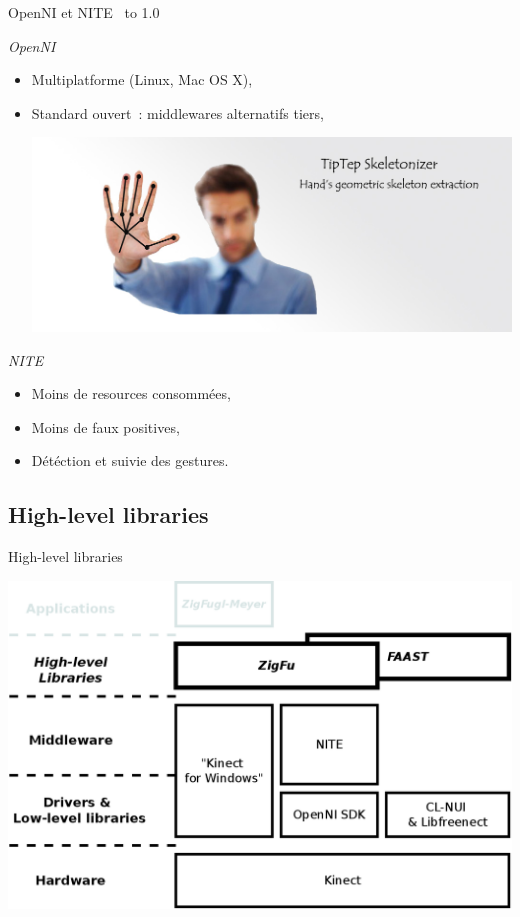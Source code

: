 \begin{frame}{OpenNI et NITE~\cite{microsoft_vs_openni}}
\vbox to 1.0\textheight
{
  \emph{OpenNI}
  \begin{itemize}
    \item<1-> Multiplatforme (Linux, Mac OS X),
    \item<2-> Standard ouvert~: middlewares alternatifs tiers,
    {
      \vfill
      \begin{center}
      \includegraphics[width=0.8\linewidth]{../images/tiptep}
      \end{center}
    }
  \end{itemize}
  
  {
  \emph{NITE}
  \begin{itemize}
    \item<3-> Moins de resources consommées,
    \item<4-> Moins de faux positives,
    \item<5-> Détéction et suivie des \og{}gestures\fg{}.
  \end{itemize}
  }
\vfill
}
\end{frame}

\subsection{High-level libraries}
\begin{frame}{High-level libraries}
\begin{center}
\includegraphics[width=0.9\linewidth]{../images/technology_overview_3}
\end{center}
\end{frame}

